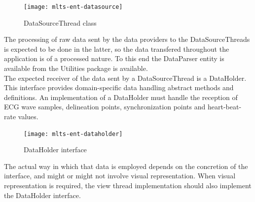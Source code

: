 		\begin{figure}[h]
		\begin{center}
	    	\texttt{[image: mlts-ent-datasource]}
  		\end{center}
  		\caption{DataSourceThread class}
		\end{figure}

		The processing of raw data sent by the data providers to the DataSourceThreads is expected to be done in the latter, so the data transfered throughout the application is of a processed nature. To this end the DataParser entity is available from the Utilities package is available.\\

		The expected receiver of the data sent by a DataSourceThread is a DataHolder. This interface provides domain-specific data handling abstract methods and definitions. An implementation of a DataHolder must handle the reception of ECG wave samples, delineation points, synchronization points and heart-beat-rate values.\\

		\begin{figure}[h]
		\begin{center}
	    	\texttt{[image: mlts-ent-dataholder]}
  		\end{center}
  		\caption{DataHolder interface}
		\end{figure}

		The actual way in which that data is employed depends on the concretion of the interface, and might or might not involve visual representation. When visual representation is required, the view thread implementation should also implement the DataHolder interface.\\


